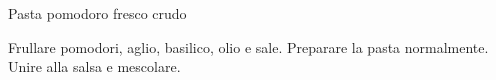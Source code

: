 \begin{recipe}{Pasta pomodoro fresco crudo}
    \begin{header}
        
    \end{header}
    
    \begin{ingredients}
    \end{ingredients}
    
    \begin{preparation}
        \step Frullare pomodori, aglio, basilico, olio e sale.
        \step Preparare la pasta normalmente.
        \step Unire alla salsa e mescolare.
    \end{preparation}
\end{recipe}
